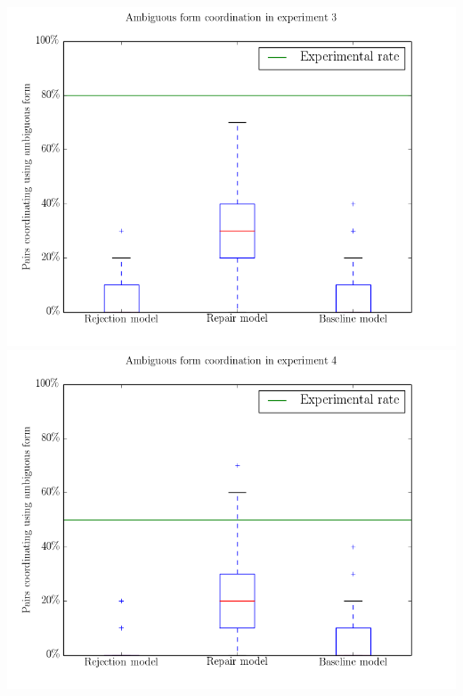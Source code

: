 \documentclass[12pt,a4paper]{article}
\begin{document}
\begin{center}
\includegraphics[width=\textwidth]{ambi_coord_exp3.png}
\includegraphics[width=\textwidth]{ambi_coord_exp4.png}
\end{center}
\end{document}
